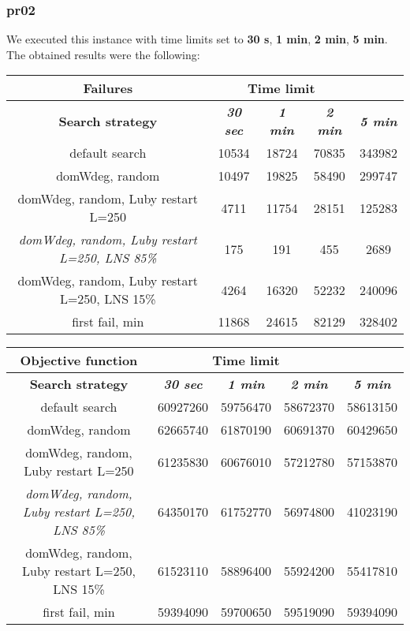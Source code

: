\subsubsection{pr02}
We executed this instance with time limits set to \textbf{30 s}, \textbf{1 min}, \textbf{2 min}, \textbf{5 min}.\\
The obtained results were the following:
{
\renewcommand{\arraystretch}{2}
\begin{longtable}[h]{| c | c | c | c | c |}
    \hline
    \textbf{Failures} & \multicolumn{3}{c}{Time limit} & \\
    \hline
    \textbf{Search strategy} & \textbf{\textit{30 sec}} & \textbf{\textit{1 min}} & \textbf{\textit{2 min}} & \textbf{\textit{5 min}} \\
    \hline
    \endhead
    default search                                         & 10534 & 18724 & 70835 & 343982 \\
    \hline
    domWdeg, random                                        & 10497 & 19825 & 58490 & 299747 \\
    \hline
    domWdeg, random, Luby restart L=250                    &  4711 & 11754 & 28151 & 125283 \\
    \hline
    \textit{domWdeg, random, Luby restart L=250, LNS 85\%} &   175 &   191 &   455 &   2689 \\
    \hline
    domWdeg, random, Luby restart L=250, LNS 15\%          &  4264 & 16320 & 52232 & 240096 \\
    \hline
    first fail, min                                        & 11868 & 24615 & 82129 & 328402 \\
    \hline
\end{longtable}
}

{
\renewcommand{\arraystretch}{2}
\begin{longtable}[h]{| c | c | c | c | c |}
    \hline
    \textbf{Objective function} & \multicolumn{3}{c}{Time limit} & \\
    \hline
    \textbf{Search strategy} & \textbf{\textit{30 sec}} & \textbf{\textit{1 min}} & \textbf{\textit{2 min}} & \textbf{\textit{5 min}} \\
    \hline
    \endhead
    default search                                         & 60927260 & 59756470 & 58672370 & 58613150 \\
    \hline
    domWdeg, random                                        & 62665740 & 61870190 & 60691370 & 60429650 \\
    \hline
    domWdeg, random, Luby restart L=250                    & 61235830 & 60676010 & 57212780 & 57153870 \\
    \hline
    \textit{domWdeg, random, Luby restart L=250, LNS 85\%} & 64350170 & 61752770 & 56974800 & 41023190 \\
    \hline
    domWdeg, random, Luby restart L=250, LNS 15\%          & 61523110 & 58896400 & 55924200 & 55417810 \\
    \hline
    first fail, min                                        & 59394090 & 59700650 & 59519090 & 59394090 \\
    \hline
\end{longtable}
}
